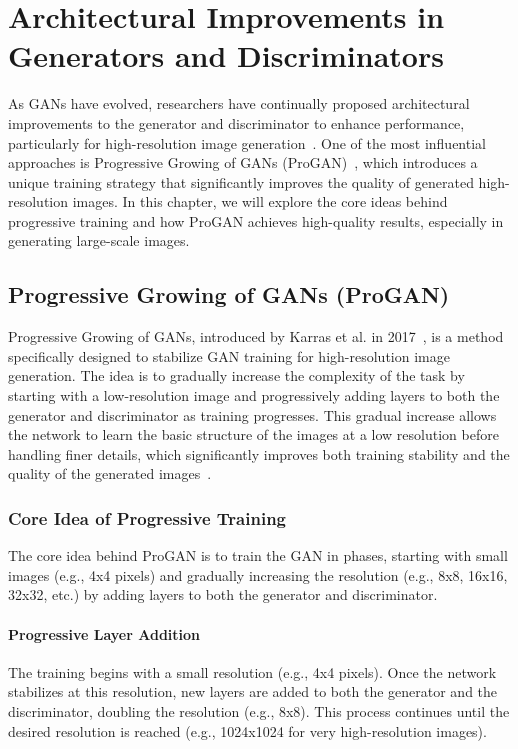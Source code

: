 \chapter{Architectural Improvements in Generators and Discriminators}
As GANs have evolved, researchers have continually proposed architectural improvements to the generator and discriminator to enhance performance, particularly for high-resolution image generation~\cite{wang2018cgan, goodfellow2014generative}. One of the most influential approaches is Progressive Growing of GANs (ProGAN)~\cite{karras2017progressive}, which introduces a unique training strategy that significantly improves the quality of generated high-resolution images. In this chapter, we will explore the core ideas behind progressive training and how ProGAN achieves high-quality results, especially in generating large-scale images.

\section{Progressive Growing of GANs (ProGAN)}
Progressive Growing of GANs, introduced by Karras et al. in 2017~\cite{karras2017progressive}, is a method specifically designed to stabilize GAN training for high-resolution image generation. The idea is to gradually increase the complexity of the task by starting with a low-resolution image and progressively adding layers to both the generator and discriminator as training progresses. This gradual increase allows the network to learn the basic structure of the images at a low resolution before handling finer details, which significantly improves both training stability and the quality of the generated images~\cite{song2021gansim}.

\subsection{Core Idea of Progressive Training}
The core idea behind ProGAN is to train the GAN in phases, starting with small images (e.g., 4x4 pixels) and gradually increasing the resolution (e.g., 8x8, 16x16, 32x32, etc.) by adding layers to both the generator and discriminator.

\subsubsection{Progressive Layer Addition}
The training begins with a small resolution (e.g., 4x4 pixels). Once the network stabilizes at this resolution, new layers are added to both the generator and the discriminator, doubling the resolution (e.g., 8x8). This process continues until the desired resolution is reached (e.g., 1024x1024 for very high-resolution images). 

